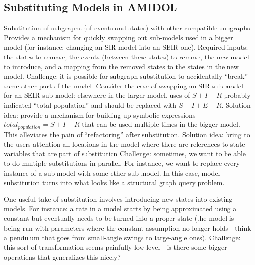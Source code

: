 \documentclass[12pt]{galois-whitepaper}
\begin{document}
\subsection{Substituting Models in AMIDOL}

Substitution of subgraphs (of events and states) with other compatible subgraphs
Provides a mechanism for quickly swapping out sub-models used in a bigger model (for instance: changing an SIR model into an SEIR one).
Required inputs: the states to remove, the events (between these states) to remove, the new model to introduce, and a mapping from the removed states to the states in the new model.
Challenge: it is possible for subgraph substitution to accidentally “break” some other part of the model. Consider the case of swapping an SIR sub-model for an SEIR sub-model: elsewhere in the larger model, uses of $S + I + R$ probably indicated “total population” and should be replaced with $S + I + E + R$.
Solution idea: provide a mechanism for building up symbolic expressions $total_{population} = S + I + R$ that can be used multiple times in the bigger model. This alleviates the pain of “refactoring” after substitution.
Solution idea: bring to the users attention all locations in the model where there are references to state variables that are part of substitution
Challenge: sometimes, we want to be able to do multiple substitutions
in parallel. For instance, we want to replace every instance of a
sub-model with some other sub-model. In this case, model substitution
turns into what looks like a structural graph query problem.

One useful take of substitution involves introducing new states into existing models. For instance: a rate in a model starts by being approximated using a constant but eventually needs to be turned into a proper state (the model is being run with parameters where the constant assumption no longer holds - think a pendulum that goes from small-angle swings to large-angle ones).
Challenge: this sort of transformation seems painfully low-level - is there some bigger operations that generalizes this nicely?
\end{document}
